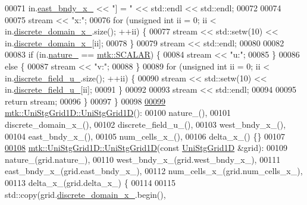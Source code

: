\begin{DoxyCode}
00071   in.\hyperlink{classmtk_1_1UniStgGrid1D_a69a7d6be3171e53177e476348d04f4ae}{east\_bndy\_x\_} << \textcolor{stringliteral}{"] = "} << std::endl << std::endl;
00072 
00074 
00075   stream << \textcolor{stringliteral}{"x:"};
00076   \textcolor{keywordflow}{for} (\textcolor{keywordtype}{unsigned} \textcolor{keywordtype}{int} ii = 0; ii < in.\hyperlink{classmtk_1_1UniStgGrid1D_a0a1f9c00e21659e05f414dd97e2a52e3}{discrete\_domain\_x\_}.size(); ++ii) \{
00077     stream << std::setw(10) << in.\hyperlink{classmtk_1_1UniStgGrid1D_a0a1f9c00e21659e05f414dd97e2a52e3}{discrete\_domain\_x\_}[ii];
00078   \}
00079   stream << std::endl;
00080 
00082 
00083   \textcolor{keywordflow}{if} (in.\hyperlink{classmtk_1_1UniStgGrid1D_a061b66c92532b1498ce0e15418754911}{nature\_} == \hyperlink{namespacemtk_ga4c54f2a329cfb4e56213b02a259d19e2af481d45bd70d41381c7d72e200889205}{mtk::SCALAR}) \{
00084     stream << \textcolor{stringliteral}{"u:"};
00085   \}
00086   \textcolor{keywordflow}{else} \{
00087     stream << \textcolor{stringliteral}{"v:"};
00088   \}
00089   \textcolor{keywordflow}{for} (\textcolor{keywordtype}{unsigned} \textcolor{keywordtype}{int} ii = 0; ii < in.\hyperlink{classmtk_1_1UniStgGrid1D_a9a1e7c4ff7f83787a1844d8b24af8045}{discrete\_field\_u\_}.size(); ++ii) \{
00090     stream << std::setw(10) << in.\hyperlink{classmtk_1_1UniStgGrid1D_a9a1e7c4ff7f83787a1844d8b24af8045}{discrete\_field\_u\_}[ii];
00091   \}
00092 
00093   stream << std::endl;
00094 
00095   \textcolor{keywordflow}{return} stream;
00096 \}
00097 \}
00098 
\hypertarget{mtk__uni__stg__grid__1d_8cc_source_l00099}{}\hyperlink{classmtk_1_1UniStgGrid1D_ab0c1bb8afad2420fdb4434eb21bdec82}{00099} \hyperlink{classmtk_1_1UniStgGrid1D_ab0c1bb8afad2420fdb4434eb21bdec82}{mtk::UniStgGrid1D::UniStgGrid1D}():
00100     nature\_(),
00101     discrete\_domain\_x\_(),
00102     discrete\_field\_u\_(),
00103     west\_bndy\_x\_(),
00104     east\_bndy\_x\_(),
00105     num\_cells\_x\_(),
00106     delta\_x\_() \{\}
00107 
\hypertarget{mtk__uni__stg__grid__1d_8cc_source_l00108}{}\hyperlink{classmtk_1_1UniStgGrid1D_a56d698e803070d96601b46f470bfef0b}{00108} \hyperlink{classmtk_1_1UniStgGrid1D_ab0c1bb8afad2420fdb4434eb21bdec82}{mtk::UniStgGrid1D::UniStgGrid1D}(\textcolor{keyword}{const} 
      \hyperlink{classmtk_1_1UniStgGrid1D}{UniStgGrid1D} &grid):
00109     nature\_(grid.nature\_),
00110     west\_bndy\_x\_(grid.west\_bndy\_x\_),
00111     east\_bndy\_x\_(grid.east\_bndy\_x\_),
00112     num\_cells\_x\_(grid.num\_cells\_x\_),
00113     delta\_x\_(grid.delta\_x\_) \{
00114 
00115     std::copy(grid.\hyperlink{classmtk_1_1UniStgGrid1D_a0a1f9c00e21659e05f414dd97e2a52e3}{discrete\_domain\_x\_}.begin(),

\end{DoxyCode}
